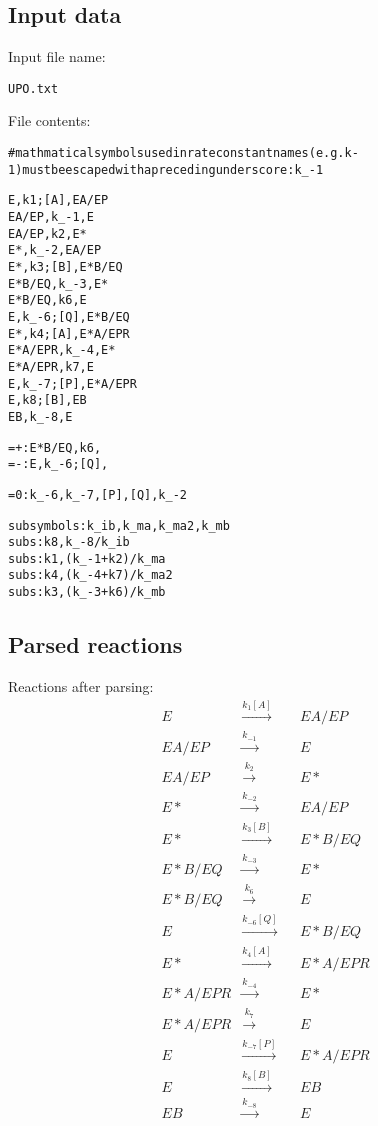 \documentclass{article}%
\begin{document}
\subsection{Input data}%
\label{subsec:Input data}%
Input file name: %
\begin{alltt}
UPO.txt
\end{alltt}%
File contents:%
\begin{alltt}
#mathmatical symbols used in rate constant names (e.g. k-1) must be escaped with a preceding underscore: k_-1

E, k1; [A], EA/EP
EA/EP, k_-1, E
EA/EP, k2, E*
E*, k_-2, EA/EP
E*, k3; [B], E*B/EQ
E*B/EQ, k_-3, E*
E*B/EQ, k6, E
E, k_-6; [Q], E*B/EQ
E*, k4; [A], E*A/EPR
E*A/EPR, k_-4, E*
E*A/EPR, k7, E
E, k_-7; [P], E*A/EPR
E, k8; [B], EB
EB, k_-8, E

=+: E*B/EQ, k6,
=-: E, k_-6; [Q],

=0: k_-6, k_-7, [P], [Q], k_-2

subsymbols: k_ib, k_ma, k_ma2, k_mb
subs:k8, k_-8/k_ib
subs:k1, (k_-1 + k2)/k_ma
subs:k4, (k_-4+k7)/k_ma2
subs:k3, (k_-3+k6)/k_mb
\end{alltt}

%
\subsection{Parsed reactions}%
\label{subsec:Parsed reactions}%
Reactions after parsing: \newline%
%
\begin{align*}
&E & \xrightarrow{k_{1}[A]} & &EA/EP\\
&EA/EP & \xrightarrow{k_{-1}} & &E\\
&EA/EP & \xrightarrow{k_{2}} & &E*\\
&E* & \xrightarrow{k_{-2}} & &EA/EP\\
&E* & \xrightarrow{k_{3}[B]} & &E*B/EQ\\
&E*B/EQ & \xrightarrow{k_{-3}} & &E*\\
&E*B/EQ & \xrightarrow{k_{6}} & &E\\
&E & \xrightarrow{k_{-6}[Q]} & &E*B/EQ\\
&E* & \xrightarrow{k_{4}[A]} & &E*A/EPR\\
&E*A/EPR & \xrightarrow{k_{-4}} & &E*\\
&E*A/EPR & \xrightarrow{k_{7}} & &E\\
&E & \xrightarrow{k_{-7}[P]} & &E*A/EPR\\
&E & \xrightarrow{k_{8}[B]} & &EB\\
&EB & \xrightarrow{k_{-8}} & &E\\
\end{align*}
\end{document}

